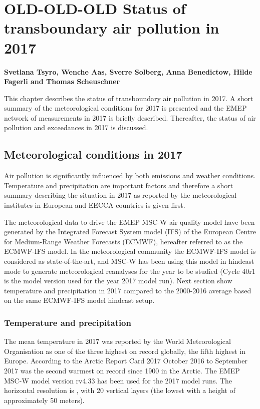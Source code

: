 \chapter[Status in 2017]{OLD-OLD-OLD Status of transboundary air pollution in 2017}
\label{ch:chapterStatus}

{\bf{Svetlana Tsyro, Wenche Aas, Sverre Solberg, Anna Benedictow, Hilde Fagerli and Thomas Scheuschner}}
\vspace{30pt}

This chapter describes the status of transboundary air pollution in 2017. A short summary of the meteorological conditions for 2017 is presented and the EMEP network of measurements in 2017 is briefly described. Thereafter, the status of air pollution and exceedances in 2017 is discussed.  

\section{Meteorological conditions in 2017}
\label{sec:meteo}
Air pollution is significantly influenced by both emissions and weather conditions. Temperature and precipitation are important factors and therefore a short summary describing the situation in 2017 as reported by the meteorological institutes in European and EECCA countries is given first.

The meteorological data to drive the EMEP MSC-W air quality model have been generated by the Integrated Forecast System model (IFS) of the European Centre for Medium-Range Weather Forecasts (ECMWF), hereafter referred to as the ECMWF-IFS model. In the meteorological community the ECMWF-IFS model is considered as state-of-the-art, and MSC-W has been using this model in hindcast mode to generate meteorological reanalyses for the year to be studied (Cycle 40r1 is the model version used for the year 2017 model run). Next section show temperature and precipitation in 2017 compared to the 2000-2016 average based on the same ECMWF-IFS model hindcast setup.

\subsection{Temperature and precipitation}
The mean temperature in 2017 was reported by the World Meteorological Organisation \citep{WMO1212:2018} as one of the three highest on record globally, the fifth highest in Europe. According to the Arctic Report Card 2017 \citep{Overland:ARC2017} October 2016 to September 2017 was the second warmest on record since 1900 in the Arctic.
The EMEP MSC-W model version rv4.33 has been used for the 2017 model
runs. The horizontal resolution is \resZO, with 20 vertical layers
(the lowest with a height of approximately 50 meters).

